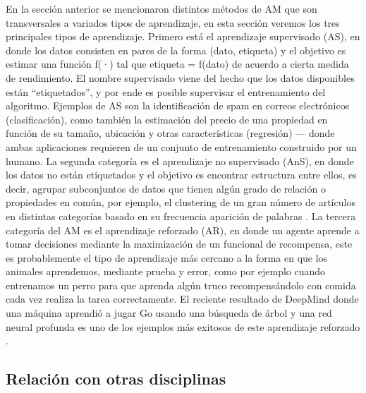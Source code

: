 En la sección anterior se mencionaron distintos métodos de AM que son transversales a variados tipos de aprendizaje, en esta sección veremos los tres principales tipos de aprendizaje. Primero está el aprendizaje supervisado (AS), en donde los datos consisten en pares de la forma (dato, etiqueta) y el objetivo es estimar una función f(·) tal que etiqueta = f(dato) de acuerdo a cierta medida de rendimiento. El nombre supervisado viene del hecho que los datos disponibles están “etiquetados”, y por ende es posible supervisar el entrenamiento del algoritmo. Ejemplos de AS son la identificación de spam en  correos electrónicos (clasificación), como también la estimación del precio de una propiedad en función de su tamaño, ubicación y otras características (regresión) --- donde ambas aplicaciones requieren de un conjunto de entrenamiento construido por un humano. La segunda categoría es el aprendizaje no supervisado (AnS), en donde los datos no están etiquetados y el objetivo es encontrar estructura entre ellos, es decir, agrupar subconjuntos de datos que tienen algún grado de relación o propiedades en común, por ejemplo, el clustering de un gran número de artículos en distintas categorías basado en su frecuencia aparición de palabras \cite{salakhutdinov_2006}. La tercera categoría del AM es el aprendizaje reforzado (AR), en donde un agente aprende a tomar decisiones mediante la maximización de un funcional de recompensa, este es probablemente el tipo de aprendizaje más cercano a la forma en que los animales aprendemos, mediante prueba y error, como por ejemplo cuando entrenamos un perro para que aprenda algún truco recompensándolo con comida cada vez realiza la tarea correctamente. El reciente resultado de DeepMind donde una máquina aprendió a jugar Go usando una búsqueda de árbol y una red neural profunda es uno de los ejemplos más exitosos de este aprendizaje reforzado \cite{silver_2016}.


\subsection{Relación con otras disciplinas}

